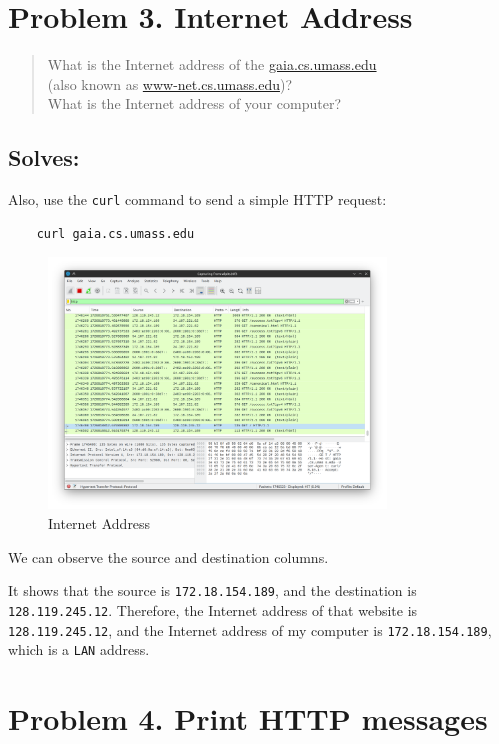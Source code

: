 \documentclass{cshwk}
\begin{document}
\section*{Problem 3. Internet Address}

\begin{quote}
    What is the Internet address of the \href{http://gaia.cs.umass.edu}{gaia.cs.umass.edu} \\
    (also known as \href{http://www-net.cs.umass.edu}{www-net.cs.umass.edu})?\\
    What is the Internet address of your computer?
\end{quote}

\subsection*{Solves:}
Also, use the \texttt{curl} command to send a simple HTTP request:
\begin{verbatim}
    curl gaia.cs.umass.edu
\end{verbatim}

\begin{figure}[htbp]
    \centering
    \includegraphics[width=0.8\textwidth]{./lab1-3.png}
    \caption{Internet Address}
    \label{fig:ip}
\end{figure}

We can observe the source and destination columns.

It shows that the source is \texttt{172.18.154.189}, and the destination is \texttt{128.119.245.12}. Therefore, the Internet address of that website is \texttt{128.119.245.12}, and the Internet address of my computer is \texttt{172.18.154.189}, which is a \texttt{LAN} address.

\section*{Problem 4. Print HTTP messages}
\end{document}

